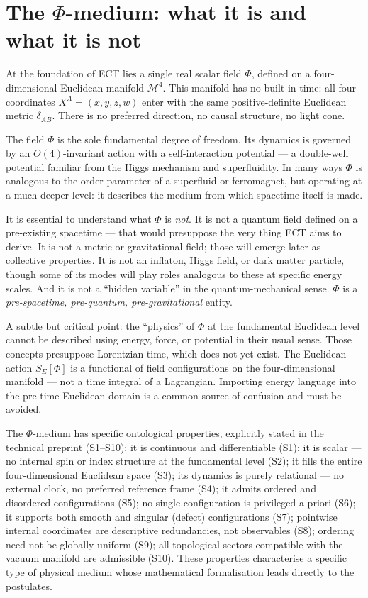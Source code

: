 \documentclass[11pt,a4paper]{article}
\begin{document}
\section{The $\Phi$-medium: what it is and what it is not}
\label{sec:pop_medium}

At the foundation of ECT lies a single real scalar field $\Phi$, defined on a four-dimensional Euclidean manifold $\mathcal{M}^4$. This manifold has no built-in time: all four coordinates $X^A = (x, y, z, w)$ enter with the same positive-definite Euclidean metric $\delta_{AB}$. There is no preferred direction, no causal structure, no light cone.

The field $\Phi$ is the sole fundamental degree of freedom. Its dynamics is governed by an $O(4)$-invariant action with a self-interaction potential --- a double-well potential familiar from the Higgs mechanism and superfluidity. In many ways $\Phi$ is analogous to the order parameter of a superfluid or ferromagnet, but operating at a much deeper level: it describes the medium from which spacetime itself is made.

It is essential to understand what $\Phi$ is \emph{not}. It is not a quantum field defined on a pre-existing spacetime --- that would presuppose the very thing ECT aims to derive. It is not a metric or gravitational field; those will emerge later as collective properties. It is not an inflaton, Higgs field, or dark matter particle, though some of its modes will play roles analogous to these at specific energy scales. And it is not a ``hidden variable'' in the quantum-mechanical sense. $\Phi$ is a \emph{pre-spacetime, pre-quantum, pre-gravitational} entity.

A subtle but critical point: the ``physics'' of $\Phi$ at the fundamental Euclidean level cannot be described using energy, force, or potential in their usual sense. Those concepts presuppose Lorentzian time, which does not yet exist. The Euclidean action $S_E[\Phi]$ is a functional of field configurations on the four-dimensional manifold --- not a time integral of a Lagrangian. Importing energy language into the pre-time Euclidean domain is a common source of confusion and must be avoided.

The $\Phi$-medium has specific ontological properties, explicitly stated in the technical preprint (S1--S10): it is continuous and differentiable (S1); it is scalar --- no internal spin or index structure at the fundamental level (S2); it fills the entire four-dimensional Euclidean space (S3); its dynamics is purely relational --- no external clock, no preferred reference frame (S4); it admits ordered and disordered configurations (S5); no single configuration is privileged a priori (S6); it supports both smooth and singular (defect) configurations (S7); pointwise internal coordinates are descriptive redundancies, not observables (S8); ordering need not be globally uniform (S9); all topological sectors compatible with the vacuum manifold are admissible (S10). These properties characterise a specific type of physical medium whose mathematical formalisation leads directly to the postulates.
\end{document}

